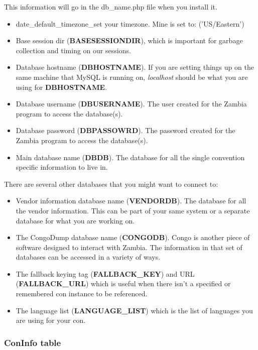 \documentclass[captions=tablesignature]{scrartcl}
\begin{document}
This information will go in the db\_name.php file when you install it.
\begin{itemize}
\item date\_default\_timezone\_set your timezone.  Mine is set to:
('US/Eastern')
\item Base session dir (\textbf{BASESESSIONDIR}), which is important for
garbage collection and timing on our sessions.
\item Database hostname (\textbf{DBHOSTNAME}). If you are setting things up on
the same machine that MySQL is running on, \emph{localhost} should be
what you are using for \textbf{DBHOSTNAME}.
\item Database username (\textbf{DBUSERNAME}).  The user created for the
Zambia program to access the database(s).
\item Database password (\textbf{DBPASSOWRD}).  The password created for the
Zambia program to access the database(s).
\item Main database name (\textbf{DBDB}).  The database for all the single
convention specific information to live in.
\end{itemize}
There are several other databases that you might want to connect to:
\begin{itemize}
\item Vendor information database name (\textbf{VENDORDB}).  The database
for all the vendor information.  This can be part of your same
system or a separate database for what you are working on.
\item The CongoDump database name (\textbf{CONGODB}). Congo is another piece of
software designed to interact with Zambia. The information in
that set of databases can be accessed in a variety of ways.
\item The fallback keying tag (\textbf{FALLBACK\_KEY}) and URL
(\textbf{FALLBACK\_URL}) which is useful when there isn't a specified
or remembered con instance to be referenced.
\item The language list (\textbf{LANGUAGE\_LIST}) which is the list of
languages you are using for your con.
\end{itemize}

\subsubsection{ConInfo table}
\label{sec-1-2-4}
\end{document}
